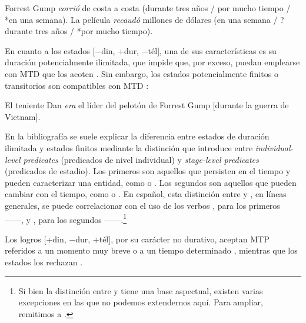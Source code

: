 \begin{exe}
  \ex\label{ex:08-forrest} Forrest Gump \textit{corrió} de costa a costa (durante
      tres años / por mucho tiempo / *en una semana).
  \ex\label{ex:08-recaudo} La película \textit{recaudó} millones de dólares (en
      una semana / ?durante tres años / *por mucho tiempo).
\end{exe}

En cuanto a los estados [$-$din, +dur, $-$tél], una de sus características es su
duración potencialmente ilimitada, que impide que, por exceso, puedan emplearse
con MTD que los acoten . Sin embargo, los estados
potencialmente finitos o transitorios son compatibles con MTD
:

\begin{exe}
  \ex\label{ex:08-dan} El teniente Dan \textit{era} el líder del pelotón de
      Forrest Gump [durante la guerra de Vietnam].
\end{exe}

\begin{recuadro}
En la bibliografía se suele explicar la diferencia entre estados de duración
ilimitada y estados finitos mediante la distinción que introduce
\textcite{carlson1977} entre \textit{individual-level predicates} (predicados de
nivel individual) y \textit{stage-level predicates} (predicados de estadio). Los
primeros son aquellos que persisten en el tiempo y pueden caracterizar una
entidad, como  o . Los
segundos son aquellos que pueden cambiar con el tiempo, como  o . En español, esta distinción
entre  y , en
líneas generales, se puede correlacionar con el uso de los verbos ,
para los primeros ------, y
, para los segundos ------.\footnote{Si bien la distinción entre  y 
tiene una base aspectual, existen varias excepciones en las que no podemos
extendernos aquí. Para ampliar, remitimos a \textcite[313 y
ss.]{bosque2009}.}
\end{recuadro}

Los logros [+din, $-$dur, +tél], por su carácter no durativo, aceptan MTP referidos a un
momento muy breve  o a un tiempo determinado
, mientras que los estados los rechazan
.

